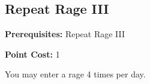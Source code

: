 \subsection*{Repeat Rage III}\label{feat:repeatrage3}

\noindent
\textbf{Prerequisites:} Repeat Rage III

\noindent
\textbf{Point Cost:} 1

You may enter a rage 4 times per day.
